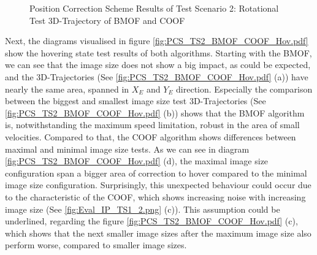 \begin{figure}[H]
\hfill
{}
\begin{center}
\end{center}
\caption{Position Correction Scheme Results of Test Scenario 2: Rotational Test 3D-Trajectory of BMOF and COOF}
\label{fig:PCS_TS2_BMOF_COOF_Rot.pdf}
\end{figure}

Next, the diagrams visualised in figure \ref{fig:PCS_TS2_BMOF_COOF_Hov.pdf} show the hovering state test results of both algorithms. Starting with the \gls{BMOF}, we can see that the image size does not show a big impact, as could be expected, and the 3D-Trajectories (See 
\ref{fig:PCS_TS2_BMOF_COOF_Hov.pdf} (a)) have nearly the same area, spanned in \ensuremath{X_E} and \ensuremath{Y_E} direction. Especially the comparison between the biggest and smallest image size test 3D-Trajectories (See \ref{fig:PCS_TS2_BMOF_COOF_Hov.pdf} (b)) shows that the \gls{BMOF} algorithm is, notwithstanding the maximum speed limitation, robust in the area of small velocities. Compared to that, the \gls{COOF} algorithm shows differences between maximal and minimal image size tests. As we can see in diagram \ref{fig:PCS_TS2_BMOF_COOF_Hov.pdf} (d), the maximal image size configuration span a bigger area of correction to hover compared to the minimal image size configuration. Surprisingly,
 this unexpected behaviour could occur due to the characteristic of the \gls{COOF}, which shows increasing noise with increasing image size (See \ref{fig:Eval_IP_TS1_2.png} (c)). This assumption could be underlined, regarding the figure \ref{fig:PCS_TS2_BMOF_COOF_Hov.pdf} (c), which shows that the next smaller image sizes after the maximum image size also perform worse, compared to smaller image sizes.

